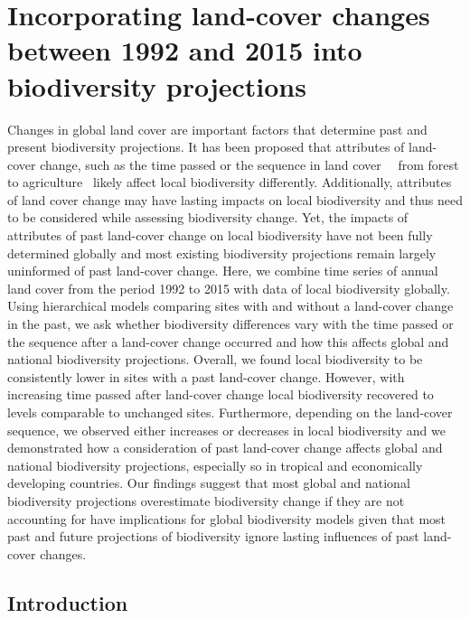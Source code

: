 \chapter{Incorporating land-cover changes between 1992 and 2015 into biodiversity projections }
\label{C04}

Changes in global land cover are important factors that determine past and present biodiversity projections. It has been proposed that attributes of land-cover change, such as the time passed or the sequence in land cover \textendash\ \ie\ from forest to agriculture \textendash\ likely affect local biodiversity differently. Additionally, attributes of land cover change may have lasting impacts on local biodiversity and thus need to be considered while assessing biodiversity change. Yet, the impacts of attributes of past land-cover change on local biodiversity have not been fully determined globally and most existing biodiversity projections remain largely uninformed of past land-cover change. Here, we combine time series of annual land cover from the period 1992 to 2015 with data of local biodiversity globally. Using hierarchical models comparing sites with and without a land-cover change in the past, we ask whether biodiversity differences vary with the time passed or the sequence after a land-cover change occurred and how this affects global and national biodiversity projections. Overall, we found local biodiversity to be consistently lower in sites with a past land-cover change. However, with increasing time passed after land-cover change local biodiversity recovered to levels comparable to unchanged sites. Furthermore, depending on the land-cover sequence, we observed either increases or decreases in local biodiversity and we demonstrated how a consideration of past land-cover change affects global and national biodiversity projections, especially so in tropical and economically developing countries. Our findings suggest that most global and national biodiversity projections overestimate biodiversity change if they are not accounting for have implications for global biodiversity models given that most past and future projections of biodiversity ignore lasting influences of past land-cover changes.

\section{Introduction}
\label{C04_01}

